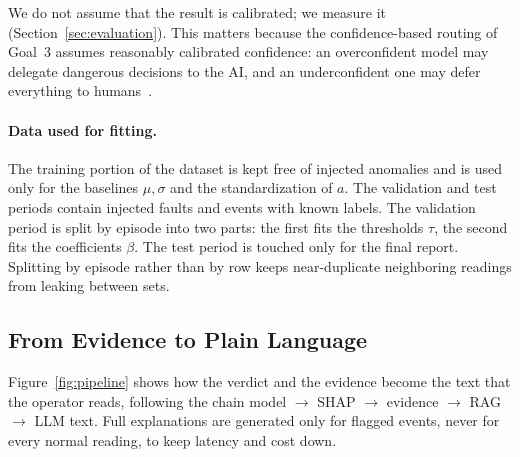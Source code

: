 \documentclass[11pt,a4paper]{article}
\begin{document}
We do not assume that the result is calibrated; we measure it (Section~\ref{sec:evaluation}). This matters because the confidence-based routing of Goal~3 assumes reasonably calibrated confidence: an overconfident model may delegate dangerous decisions to the AI, and an underconfident one may defer everything to humans~\cite{trustcal}.

\paragraph{Data used for fitting.} The training portion of the dataset is kept free of injected anomalies and is used only for
the baselines $\mu,\sigma$ and the standardization of $a$. The validation and test periods contain injected
faults and events with known labels. The validation period is split by episode into two parts: the first
fits the thresholds $\tau$, the second fits the coefficients $\beta$. The test period is touched only for the
final report. Splitting by episode rather than by row keeps near-duplicate neighboring readings from leaking
between sets.

\subsection{From Evidence to Plain Language}
\label{sec:language}
Figure~\ref{fig:pipeline} shows how the verdict and the evidence become the text that the operator reads,
following the chain model $\rightarrow$ SHAP $\rightarrow$ evidence $\rightarrow$ RAG $\rightarrow$ LLM text.
Full explanations are generated only for flagged events, never for every normal reading, to keep latency and
cost down.
\end{document}
